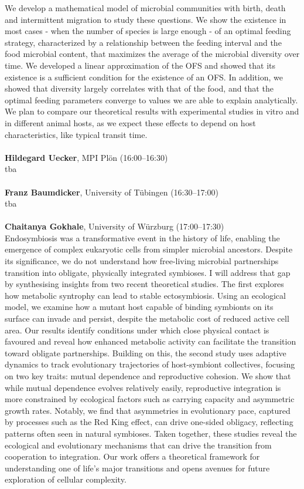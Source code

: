 \documentclass[12pt,a4paper]{article}
\begin{document}
 We develop a mathematical model of microbial communities with birth, death and intermittent migration to study these questions. We show the existence in most cases - when the number of species is large enough - of an optimal feeding strategy, characterized by a relationship between the feeding interval and the food microbial content, that maximizes the average of the microbial diversity over time. We developed a linear approximation of the OFS and showed that its existence is a sufficient condition for the existence of an OFS. In addition, we showed that diversity largely correlates with that of the food, and that the optimal feeding parameters converge to values we are able to explain analytically.  We plan to compare our theoretical results with experimental studies in vitro and in different animal hosts, as we expect these effects to depend on host characteristics, like typical transit time. \\
\\[1ex]{ \large \textbf{ Hildegard Uecker}}, MPI Plön (16:00--16:30) \\[2ex] tba \\
\\[1ex]{ \large \textbf{ Franz Baumdicker}}, University of Tübingen (16:30--17:00) \\[2ex] tba \\
\\[1ex]{ \large \textbf{ Chaitanya Gokhale}}, University of Würzburg (17:00--17:30) \\[2ex] Endosymbiosis was a transformative event in the history of life, enabling the emergence of complex eukaryotic cells from simpler microbial ancestors. Despite its significance, we do not understand how free-living microbial partnerships transition into obligate, physically integrated symbioses. I will address that gap by synthesising insights from two recent theoretical studies. The first explores how metabolic syntrophy can lead to stable ectosymbiosis. Using an ecological model, we examine how a mutant host capable of binding symbionts on its surface can invade and persist, despite the metabolic cost of reduced active cell area. Our results identify conditions under which close physical contact is favoured and reveal how enhanced metabolic activity can facilitate the transition toward obligate partnerships. Building on this, the second study uses adaptive dynamics to track evolutionary trajectories of host-symbiont collectives, focusing on two key traits: mutual dependence and reproductive cohesion. We show that while mutual dependence evolves relatively easily, reproductive integration is more constrained by ecological factors such as carrying capacity and asymmetric growth rates. Notably, we find that asymmetries in evolutionary pace, captured by processes such as the Red King effect, can drive one-sided obligacy, reflecting patterns often seen in natural symbioses. Taken together, these studies reveal the ecological and evolutionary mechanisms that can drive the transition from cooperation to integration. Our work offers a theoretical framework for understanding one of life’s major transitions and opens avenues for future exploration of cellular complexity. \\
\end{document}
